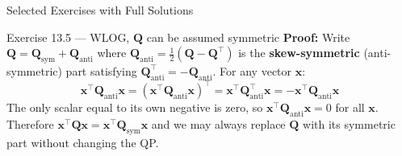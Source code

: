 \documentclass[aspectratio=169,10pt]{beamer}
\newcommand{\bx}{\mathbf{x}}
\newcommand{\bQ}{\mathbf{Q}}
\begin{document}
\begin{frame}[allowframebreaks]{Selected Exercises with Full Solutions}
\begin{block}{Exercise 13.5 --- WLOG, $\bQ$ can be assumed symmetric}
    \textbf{Proof:}  Write $\bQ = \bQ_{\mathrm{sym}} + \bQ_{\mathrm{anti}}$ where
    $\bQ_{\mathrm{anti}} = \tfrac{1}{2}(\bQ - \bQ^{\top})$ is the
    \textbf{skew-symmetric} (anti-symmetric) part satisfying
    $\bQ_{\mathrm{anti}}^{\top} = -\bQ_{\mathrm{anti}}$.  For any vector $\bx$:
    \[
      \bx^{\top}\bQ_{\mathrm{anti}}\bx
      = (\bx^{\top}\bQ_{\mathrm{anti}}\bx)^{\top}
      = \bx^{\top}\bQ_{\mathrm{anti}}^{\top}\bx
      = -\bx^{\top}\bQ_{\mathrm{anti}}\bx
    \]
    The only scalar equal to its own negative is zero, so
    $\bx^{\top}\bQ_{\mathrm{anti}}\bx = 0$ for all $\bx$.
    Therefore $\bx^{\top}\bQ\bx = \bx^{\top}\bQ_{\mathrm{sym}}\bx$ and we may
    always replace $\bQ$ with its symmetric part without changing the QP.
  \end{block}

\end{frame}
\end{document}
